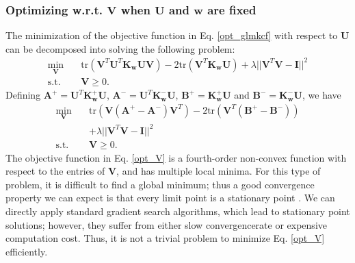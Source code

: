 \documentclass[10pt,journal,compsoc]{IEEEtran}
\newcommand{\st}{\mathrm{s.t.}}
\newcommand{\tr}{\mathrm{tr}}
\begin{document}
\subsubsection{Optimizing w.r.t. $\mathbf{V}$ when $\mathbf{U}$ and $\mathbf{w}$ are fixed}
The minimization of the objective function in Eq. \eqref{opt_glmkcf} with respect to $\mathbf{U}$ can be decomposed into solving the following problem:
\begin{align}\label{opt_V}
\min_{\mathbf{V}} \quad & \tr( \mathbf{V}^T \mathbf{U}^T \mathbf{K}_{\mathbf{w}} \mathbf{U} \mathbf{V}) - 2 \tr(\mathbf{V}^T \mathbf{K}_{\mathbf{w}} \mathbf{U}) + \lambda ||\mathbf{V}^T \mathbf{V} - \mathbf{I}||^2 \nonumber \\
\st \quad & \mathbf{V} \geq 0. 
\end{align}
Defining $\mathbf{A}^{+} = \mathbf{U}^T \mathbf{K}_{\mathbf{w}}^{+} \mathbf{U}$, $\mathbf{A}^{-} = \mathbf{U}^T \mathbf{K}_{\mathbf{w}}^{-} \mathbf{U}$, $\mathbf{B}^{+} = \mathbf{K}_{\mathbf{w}}^{+} \mathbf{U}$ and $\mathbf{B}^{-} = \mathbf{K}_{\mathbf{w}}^{-} \mathbf{U}$, we have
\begin{align}
\min_{\mathbf{V}} \quad & \tr(\mathbf{V} ( \mathbf{A}^{+} - \mathbf{A}^{-} ) \mathbf{V}^T ) - 2 \tr(\mathbf{V}^T (\mathbf{B}^{+} - \mathbf{B}^{-}) ) \nonumber \\
& + \lambda ||\mathbf{V}^T \mathbf{V} - \mathbf{I}||^2 \\
\st \quad & \mathbf{V} \geq 0. \nonumber
\end{align}
The objective function in Eq. \eqref{opt_V} is a fourth-order non-convex function with respect to the entries of $\mathbf{V}$, and has multiple local minima. For this type of problem, it is difficult to find a global minimum; thus a good convergence property we can expect is that every limit point is a stationary point \cite{xxx}. We can directly apply standard gradient search algorithms, which lead to stationary point solutions; however, they suffer from either slow convergencerate or expensive computation cost. Thus, it is not a trivial problem to minimize Eq. \eqref{opt_V} efficiently.
\end{document}
